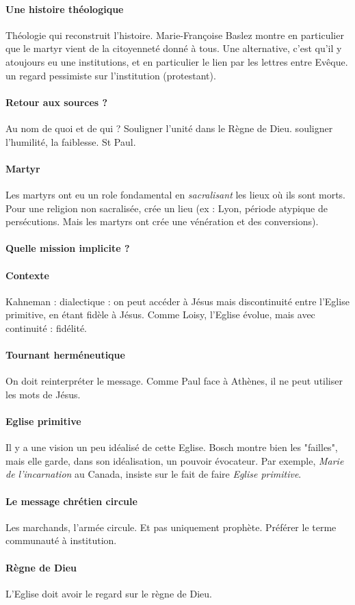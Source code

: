 \paragraph{Une histoire théologique} Théologie qui reconstruit l'histoire. Marie-Françoise Baslez montre en particulier que le martyr vient de la citoyenneté donné à tous. Une alternative, c'est qu'il y atoujours eu une institutions, et en particulier le lien par les lettres entre Evêque. un regard pessimiste sur l'institution (protestant). 

\paragraph{Retour aux sources ?} Au nom de quoi et de qui ? 
Souligner l'unité dans le Règne de Dieu. souligner l'humilité, la faiblesse. St Paul.

\paragraph{Martyr} Les martyrs ont eu un role fondamental en \textit{sacralisant} les lieux où ils sont morts. Pour une religion non sacralisée, crée un lieu (ex : Lyon, période atypique de persécutions. Mais les martyrs ont crée une vénération et des conversions).   


\paragraph{Quelle mission implicite ?}

\paragraph{Contexte} Kahneman : dialectique : on peut accéder à Jésus mais discontinuité entre l'Eglise primitive, en étant fidèle à Jésus.  Comme Loisy, l'Eglise évolue, mais avec continuité : fidélité.

\paragraph{Tournant herméneutique} On doit reinterpréter le message. Comme Paul face à Athènes, il ne peut utiliser les mots de Jésus.

\paragraph{Eglise primitive} Il y a une vision un peu idéalisé de cette Eglise. Bosch montre bien les "failles", mais elle garde, dans son idéalisation, un pouvoir évocateur. Par exemple, \textit{Marie de l'incarnation} au Canada, insiste sur le fait de faire \textit{Eglise primitive}. 

\paragraph{Le message chrétien circule} Les marchands, l'armée circule. Et pas uniquement prophète. Préférer le terme communauté à institution. 

\paragraph{Règne de Dieu} L'Eglise doit avoir le regard sur le règne de Dieu.

